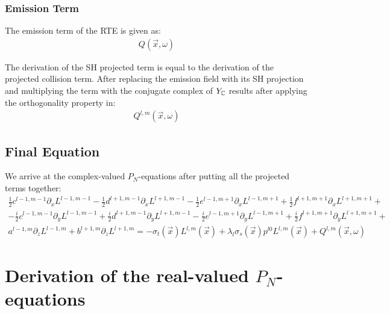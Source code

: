 \documentclass[10pt]{scrartcl}
\begin{document}
\subsubsection{Emission Term}

The emission term of the RTE is given as:
\begin{align}
Q\left(\vec{x}, \omega\right)
\end{align}

The derivation of the SH projected term is equal to the derivation of the projected collision term. After replacing the emission field with its SH projection and multiplying the term with the conjugate complex of $Y_{\mathbb{C}}$ results after applying the orthogonality property in:
\begin{align}
Q^{l,m}\left(\vec{x}, \omega\right)
\end{align}

\subsection{Final Equation}

We arrive at the complex-valued $P_N$-equations after putting all the projected terms together:
\begin{align*}
\frac{1}{2}c^{l-1, m-1}\partial_x L^{l-1,m-1} - \frac{1}{2}d^{l+1, m-1}\partial_x L^{l+1,m-1} - \frac{1}{2}e^{l-1, m+1}\partial_x L^{l-1,m+1} + \frac{1}{2}f^{l+1, m+1}\partial_x L^{l+1,m+1}+
\\
-\frac{i}{2}c^{l-1, m-1}\partial_y L^{l-1,m-1} + \frac{i}{2}d^{l+1, m-1}\partial_y L^{l+1,m-1} - \frac{i}{2}e^{l-1, m+1}\partial_y L^{l-1,m+1} + \frac{i}{2}f^{l+1, m+1}\partial_y L^{l+1,m+1}+
\\
a^{l-1, m}\partial_z L^{l-1,m}+b^{l+1, m}\partial_z L^{l+1,m}
=
-\sigma_t\left(\vec{x}\right)L^{l,m}\left(\vec{x}\right )
+
\lambda_l
\sigma_s(\vec{x})
p^{l0}L^{l,m}(\vec{x}) + Q^{l,m}\left(\vec{x}, \omega\right)
\end{align*}


\section{Derivation of the real-valued $P_N$-equations}
\label{sec:real}
\end{document}

